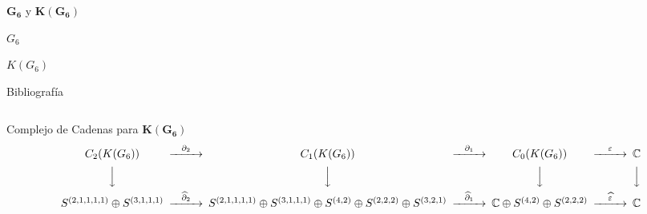 \documentclass[final,xcolor=svgnames]{beamer}
\begin{document}
\begin{frame}{}
\begin{columns}
\begin{column}{0.5\textwidth}
\begin{block}{$\boldsymbol{G_6}$ y $\boldsymbol{K(G_6)}$}
\begin{minipage}{0.53\linewidth}
    $G_{6}$
  \end{minipage}
  \begin{minipage}{0.4\linewidth}  
    \centering   

    $K(G_{6})$
  \end{minipage}
\end{block}
\begin{block}{Bibliografía}
\end{block}
\end{column}
\end{columns}

  \vfill

  \begin{block}{Complejo de Cadenas para $\boldsymbol{K(G_{6})}$}
    \[
    \begin{CD}
      C_{2}(K(G_{6})) @>{\partial_{2}}>> C_{1}(K(G_{6})) @>{\partial_{1}}>> C_{0}(K(G_{6})) @>{\varepsilon}>> \mathbb{C}\\
      @VVV   @VVV   @VVV   @VVV    \\
      S^{(2,1,1,1,1)}\oplus S^{(3,1,1,1)} @>{\widehat\partial_{2}}>>
      S^{(2,1,1,1,1)}\oplus S^{(3,1,1,1)}\oplus S^{(4,2)}\oplus S^{(2,2,2)}\oplus S^{(3,2,1)} @>{\widehat\partial_{1}}>> 
      \mathbb{C} \oplus S^{(4,2)}\oplus S^{(2,2,2)} @>{\widehat \varepsilon}>>  \mathbb{C}
    \end{CD}
    \]
  \end{block}
\end{frame}
\end{document}
